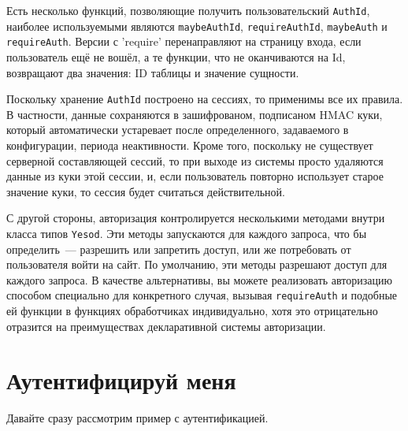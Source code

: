 Есть несколько функций, позволяющие получить пользовательский \lstinline'AuthId', наиболее используемыми являются \lstinline'maybeAuthId', \lstinline'requireAuthId', \lstinline'maybeAuth' и \lstinline'requireAuth'. Версии с 'require' перенаправляют на страницу входа, если пользователь ещё не вошёл, а те функции, что не оканчиваются на Id, возвращают два значения: ID таблицы и значение сущности.

Поскольку хранение \lstinline'AuthId' построено на сессиях, то применимы все их правила. В частности, данные сохраняются в зашифрованом, подписаном HMAC куки, который автоматически устаревает после определенного, задаваемого в конфигурации, периода неактивности. Кроме того, поскольку не существует серверной составляющей сессий, то при выходе из системы просто удаляются данные из куки этой сессии, и, если пользователь повторно использует старое значение куки, то сессия будет считаться действительной.

С другой стороны, авторизация контролируется несколькими методами внутри класса типов \lstinline'Yesod'. Эти методы запускаются для каждого запроса, что бы определить~--- разрешить или запретить доступ, или же потребовать от пользователя войти на сайт. По умолчанию, эти методы разрешают доступ для каждого запроса. В качестве альтернативы, вы можете реализовать авторизацию способом специально для конкретного случая, вызывая \lstinline'requireAuth' и подобные ей функции в функциях обработчиках индивидуально, хотя это отрицательно отразится на преимуществах декларативной системы авторизации.

\section{Аутентифицируй меня}

Давайте сразу рассмотрим пример с аутентификацией.


